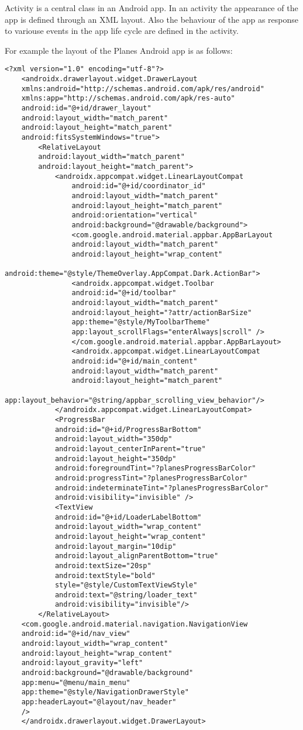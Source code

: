 Activity is a central class in an Android app. In an activity the appearance of the app is defined through an XML layout. Also the behaviour of the app as response to variouse events in the app life cycle are defined in the activity.

For example the layout of the Planes Android app is as follows:

\begin{lstlisting}
<?xml version="1.0" encoding="utf-8"?>
	<androidx.drawerlayout.widget.DrawerLayout
	xmlns:android="http://schemas.android.com/apk/res/android"
	xmlns:app="http://schemas.android.com/apk/res-auto"
	android:id="@+id/drawer_layout"
	android:layout_width="match_parent"
	android:layout_height="match_parent"
	android:fitsSystemWindows="true">
		<RelativeLayout
		android:layout_width="match_parent"
		android:layout_height="match_parent">
			<androidx.appcompat.widget.LinearLayoutCompat
				android:id="@+id/coordinator_id"
				android:layout_width="match_parent"
				android:layout_height="match_parent"
				android:orientation="vertical"
				android:background="@drawable/background">
				<com.google.android.material.appbar.AppBarLayout
				android:layout_width="match_parent"
				android:layout_height="wrap_content"
				android:theme="@style/ThemeOverlay.AppCompat.Dark.ActionBar">
				<androidx.appcompat.widget.Toolbar
				android:id="@+id/toolbar"
				android:layout_width="match_parent"
				android:layout_height="?attr/actionBarSize"
				app:theme="@style/MyToolbarTheme"
				app:layout_scrollFlags="enterAlways|scroll" />
				</com.google.android.material.appbar.AppBarLayout>
				<androidx.appcompat.widget.LinearLayoutCompat
				android:id="@+id/main_content"
				android:layout_width="match_parent"
				android:layout_height="match_parent"
				app:layout_behavior="@string/appbar_scrolling_view_behavior"/>
			</androidx.appcompat.widget.LinearLayoutCompat>
			<ProgressBar
			android:id="@+id/ProgressBarBottom"
			android:layout_width="350dp"
			android:layout_centerInParent="true"
			android:layout_height="350dp"
			android:foregroundTint="?planesProgressBarColor"
			android:progressTint="?planesProgressBarColor"
			android:indeterminateTint="?planesProgressBarColor"
			android:visibility="invisible" />
			<TextView
			android:id="@+id/LoaderLabelBottom"
			android:layout_width="wrap_content"
			android:layout_height="wrap_content"
			android:layout_margin="10dip"
			android:layout_alignParentBottom="true"
			android:textSize="20sp"
			android:textStyle="bold"
			style="@style/CustomTextViewStyle"
			android:text="@string/loader_text"
			android:visibility="invisible"/>
		</RelativeLayout>
	<com.google.android.material.navigation.NavigationView
	android:id="@+id/nav_view"
	android:layout_width="wrap_content"
	android:layout_height="wrap_content"
	android:layout_gravity="left"
	android:background="@drawable/background"
	app:menu="@menu/main_menu"
	app:theme="@style/NavigationDrawerStyle"
	app:headerLayout="@layout/nav_header"
	/>
	</androidx.drawerlayout.widget.DrawerLayout>
\end{lstlisting}
 
